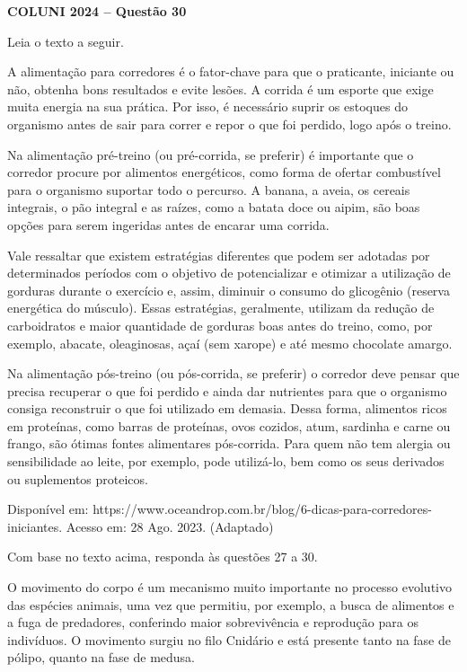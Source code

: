 \textbf{COLUNI 2024 -- Questão 30}\par\medskip Leia o texto a seguir.

A alimentação para corredores é o fator-chave para que o praticante, iniciante ou não, obtenha bons resultados e evite lesões. A corrida é um esporte que exige muita energia na sua prática. Por isso, é necessário suprir os estoques do organismo antes de sair para correr e repor o que foi perdido, logo após o treino.

Na alimentação pré-treino (ou pré-corrida, se preferir) é importante que o corredor procure por alimentos energéticos, como forma de ofertar combustível para o organismo suportar todo o percurso. A banana, a aveia, os cereais integrais, o pão integral e as raízes, como a batata doce ou aipim, são boas opções para serem ingeridas antes de encarar uma corrida.

Vale ressaltar que existem estratégias diferentes que podem ser adotadas por determinados períodos com o objetivo de potencializar e otimizar a utilização de gorduras durante o exercício e, assim, diminuir o consumo do glicogênio (reserva energética do músculo). Essas estratégias, geralmente, utilizam da redução de carboidratos e maior quantidade de gorduras boas antes do treino, como, por exemplo, abacate, oleaginosas, açaí (sem xarope) e até mesmo chocolate amargo.

Na alimentação pós-treino (ou pós-corrida, se preferir) o corredor deve pensar que precisa recuperar o que foi perdido e ainda dar nutrientes para que o organismo consiga reconstruir o que foi utilizado em demasia. Dessa forma, alimentos ricos em proteínas, como barras de proteínas, ovos cozidos, atum, sardinha e carne ou frango, são ótimas fontes alimentares pós-corrida. Para quem não tem alergia ou sensibilidade ao leite, por exemplo, pode utilizá-lo, bem como os seus derivados ou suplementos proteicos.

Disponível em: https://www.oceandrop.com.br/blog/6-dicas-para-corredores-iniciantes. Acesso em: 28 Ago. 2023. (Adaptado)

Com base no texto acima, responda às questões 27 a 30.

O movimento do corpo é um mecanismo muito importante no processo evolutivo das espécies animais, uma vez que permitiu, por exemplo, a busca de alimentos e a fuga de predadores, conferindo maior sobrevivência e reprodução para os indivíduos. O movimento surgiu no filo Cnidário e está presente tanto na fase de pólipo, quanto na fase de medusa.

